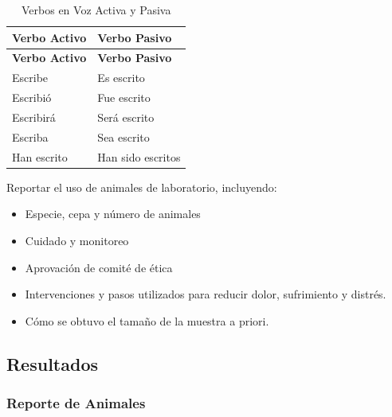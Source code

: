 \documentclass[
  10pt]{article}
\providecommand{\tightlist}{%
  \setlength{\itemsep}{0pt}\setlength{\parskip}{0pt}}\usepackage{longtable,booktabs,array}
\begin{document}
\begin{tcolorbox}
\begin{longtable}[]{@{}ll@{}}
\caption{Verbos en Voz Activa y Pasiva}\label{tbl-verbos}\tabularnewline
\toprule\noalign{}
\textbf{Verbo Activo} & \textbf{Verbo Pasivo} \\
\midrule\noalign{}
\endfirsthead
\toprule\noalign{}
\textbf{Verbo Activo} & \textbf{Verbo Pasivo} \\
\midrule\noalign{}
\endhead
\bottomrule\noalign{}
\endlastfoot
Escribe & Es escrito \\
Escribió & Fue escrito \\
Escribirá & Será escrito \\
Escriba & Sea escrito \\
Han escrito & Han sido escritos \\
\end{longtable}

\end{tcolorbox}

\begin{tcolorbox}[enhanced jigsaw, colframe=quarto-callout-tip-color-frame, toprule=.15mm, opacitybacktitle=0.6, arc=.35mm, coltitle=black, title=\textcolor{quarto-callout-tip-color}{\faLightbulb}\hspace{0.5em}{Animales de Laboratorio}, breakable, rightrule=.15mm, bottomtitle=1mm, titlerule=0mm, leftrule=.75mm, opacityback=0, colbacktitle=quarto-callout-tip-color!10!white, colback=white, left=2mm, bottomrule=.15mm, toptitle=1mm]

Reportar el uso de animales de laboratorio, incluyendo:

\begin{itemize}
\tightlist
\item
  Especie, cepa y número de animales
\item
  Cuidado y monitoreo
\item
  Aprovación de comité de ética
\item
  Intervenciones y pasos utilizados para reducir dolor, sufrimiento y
  distrés.
\item
  Cómo se obtuvo el tamaño de la muestra a priori.
\end{itemize}

\end{tcolorbox}

\subsection{Resultados}\label{resultados}

\subsubsection{Reporte de Animales}\label{reporte-de-animales}
\end{document}
